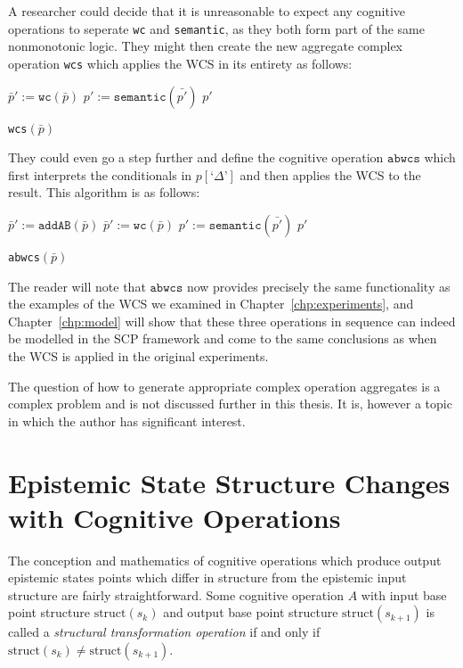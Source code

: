 {A researcher could decide that it is unreasonable to expect any cognitive operations to seperate \texttt{wc} and \texttt{semantic}, as they both form part of the same nonmonotonic logic. They might then create the new aggregate complex operation \texttt{wcs} which applies the WCS in its entirety as follows:

\begin{algorithm}[H] 
\SetAlgoLined
{}
{
$\bar{p}':=\texttt{wc}(\bar{p})$\;
$p':=\texttt{semantic}(\bar{p'})$\;
\Return $p'$
}

\caption{\texttt{wcs}$(\bar{p})$}
\label{cogOp:wcs}
\end{algorithm}

They could even go a step further and define the cognitive operation $\texttt{abwcs}$ which first interprets the conditionals in $p[\textrm{`}\Delta\textrm{'}]$ and then applies the WCS to the result. This algorithm is as follows:

\begin{algorithm}[H] 
\SetAlgoLined
{}
{
$\bar{p}':=\texttt{addAB}(\bar{p})$\;
$\bar{p}':=\texttt{wc}(\bar{p})$\;
$p':=\texttt{semantic}(\bar{p'})$\;
\Return $p'$
}

\caption{\texttt{abwcs}$(\bar{p})$}
\label{cogOp:abwcs}
\end{algorithm}

The reader will note that $\texttt{abwcs}$ now provides precisely the same functionality as the examples of the WCS we examined in Chapter~\ref{chp:experiments}, and Chapter~\ref{chp:model} will show that these three operations in sequence can indeed be modelled in the SCP framework and come to the same conclusions as when the WCS is applied in the original experiments.

The question of how to generate appropriate complex operation aggregates is a complex problem and is not discussed further in this thesis. It is, however a topic in which the author has significant interest.


\section{Epistemic State Structure Changes with Cognitive Operations}
The conception and mathematics of cognitive operations which produce output epistemic states points which differ in structure from the epistemic input structure are fairly straightforward. Some cognitive operation $A$ with input base point structure $\textrm{struct}(s_k)$ and output base point structure $\textrm{struct}(s_{k+1})$ is called a \textit{structural transformation operation} if and only if $\textrm{struct}(s_k) \ne \textrm{struct}(s_{k+1})$.

}
